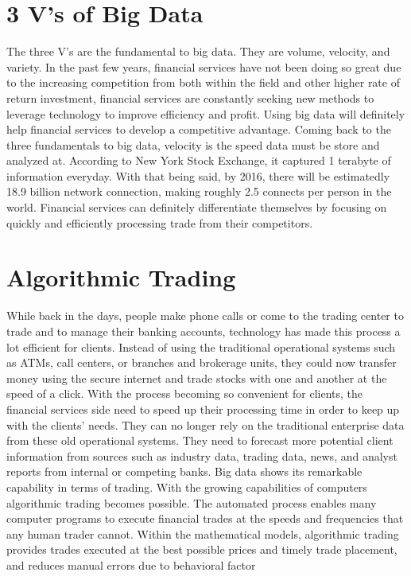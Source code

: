 \documentclass[sigconf]{acmart}
\begin{document}
\section{3 V's of Big Data}
The three V's are the fundamental to big data. They are volume, velocity, and variety. \cite{Nath2015} In the past few years, financial services have not been doing so great due to the increasing competition from both within the field and other higher rate of return investment, financial services are constantly seeking new methods to leverage technology to improve efficiency and profit. Using big data will definitely help financial services to develop a competitive advantage. \cite{Nath2015} Coming back to the three fundamentals to big data, velocity is the speed data must be store and analyzed at. According to New York Stock Exchange, it captured 1 terabyte of information everyday. With that being said, by 2016, there will be estimatedly 18.9 billion network connection, making roughly 2.5 connects per person in the world. Financial services can definitely differentiate themselves by focusing on quickly and efficiently processing trade from their competitors.\cite{Turner2013}

\section{Algorithmic Trading}
While back in the days, people make phone calls or come to the trading center to trade and to manage their banking accounts, technology has made this process a lot efficient for clients. Instead of using the traditional operational systems such as ATMs, call centers, or branches and brokerage units, they could now transfer money using the secure internet and trade stocks with one and another at the speed of a click. With the process becoming so convenient for clients, the financial services side need to speed up their processing time in order to keep up with the clients' needs. They can no longer rely on the traditional enterprise data from these old operational systems. They need to forecast more potential client information from sources such as industry data, trading data, news, and analyst reports from internal or competing banks. Big data shows its remarkable capability in terms of trading. With the growing capabilities of computers algorithmic trading becomes possible. The automated process enables many computer programs to execute financial trades at the speeds and frequencies that any human trader cannot. Within the mathematical models, algorithmic trading provides trades executed at the best possible prices and timely trade placement, and reduces manual errors due to behavioral factor\cite {Turner2013}
\end{document}

